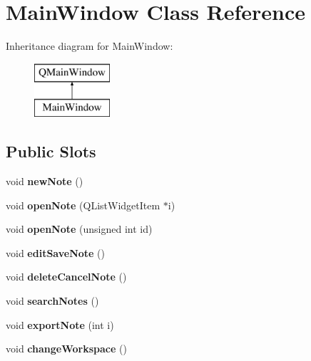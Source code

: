 \hypertarget{class_main_window}{\section{Main\-Window Class Reference}
\label{class_main_window}
}
Inheritance diagram for Main\-Window\-:\begin{figure}[H]
\begin{center}
\leavevmode
\includegraphics[height=2.000000cm]{class_main_window}
\end{center}
\end{figure}
\subsection*{Public Slots}
\begin{DoxyCompactItemize}
\item 
\hypertarget{class_main_window_ae96d83550c8c4e55e2f2f5da3065f260}{void {\bfseries new\-Note} ()}\label{class_main_window_ae96d83550c8c4e55e2f2f5da3065f260}

\item 
\hypertarget{class_main_window_a6dc3b06ef3985732cefcbe9933c5ba96}{void {\bfseries open\-Note} (Q\-List\-Widget\-Item $\ast$i)}\label{class_main_window_a6dc3b06ef3985732cefcbe9933c5ba96}

\item 
\hypertarget{class_main_window_a42e90f5401c31640e24e9b0f5286def1}{void {\bfseries open\-Note} (unsigned int id)}\label{class_main_window_a42e90f5401c31640e24e9b0f5286def1}

\item 
\hypertarget{class_main_window_a193a58d6dd0d36a5f2699589a0a06fd6}{void {\bfseries edit\-Save\-Note} ()}\label{class_main_window_a193a58d6dd0d36a5f2699589a0a06fd6}

\item 
\hypertarget{class_main_window_a7943fcd43147d8151ace40a1ac7d4ec4}{void {\bfseries delete\-Cancel\-Note} ()}\label{class_main_window_a7943fcd43147d8151ace40a1ac7d4ec4}

\item 
\hypertarget{class_main_window_abd2b126f767bb4dad9746ae3918f8b57}{void {\bfseries search\-Notes} ()}\label{class_main_window_abd2b126f767bb4dad9746ae3918f8b57}

\item 
\hypertarget{class_main_window_acea573d576bff1729645faf9273038a6}{void {\bfseries export\-Note} (int i)}\label{class_main_window_acea573d576bff1729645faf9273038a6}

\item 
\hypertarget{class_main_window_afe3a27e81d39cf7f4d2a4cd15c415372}{void {\bfseries change\-Workspace} ()}\label{class_main_window_afe3a27e81d39cf7f4d2a4cd15c415372}

\end{DoxyCompactItemize}
